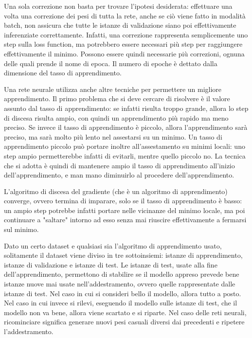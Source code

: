 Una sola correzione non basta per trovare l'ipotesi desiderata: effettuare una
volta una correzione dei pesi di tutta la rete, anche se ciò viene fatto in
modalità batch, non assicura che tutte le istanze di validazione siano poi
effettivamente inferenziate correttamente.
Infatti, una correzione rappresenta semplicemente uno step sulla loss function,
ma potrebbero essere necessari più step per raggiungere effettivamente
il minimo.
Possono essere quindi necessarie più correzioni, ognuna delle quali prende il
nome di epoca.
Il numero di epoche è dettato dalla dimensione del tasso di apprendimento.

Una rete neurale utilizza anche altre tecniche per permettere un migliore
apprendimento.
Il primo problema che si deve cercare di risolvere è il valore assunto dal tasso
di apprendimento: se infatti risulta troppo grande, allora lo step di discesa
risulta ampio, con quindi un apprendimento più rapido ma meno preciso.
Se invece il tasso di apprendimento è piccolo, allora l'apprendimento sarà
preciso, ma sarà molto più lento nel assestarsi su un minimo.
Un tasso di apprendimento piccolo può portare inoltre all'assestamento su minimi
locali: uno step ampio permetterebbe infatti di evitarli, mentre quello piccolo
no.
La tecnica che si adotta è quindi di mantenere ampio il tasso di apprendimento
all'inizio dell'apprendimento, e man mano diminuirlo al procedere
dell'apprendimento.

L'algoritmo di discesa del gradiente (che è un algoritmo di apprendimento)
converge, ovvero termina di imparare, solo se il tasso di apprendimento è basso:
un ampio step potrebbe infatti portare nelle vicinanze del minimo locale, ma poi
continuare a "saltare" intorno ad esso senza mai riuscire effettivamente a
fermarsi sul minimo.

Dato un certo dataset e qualsiasi sia l'algoritmo di apprendimento usato,
solitamente il dataset viene diviso in tre sottoinsiemi: istanze di
apprendimento, istanze di validazione e istanze di test.
Le istanze di test, usate alla fine dell'apprendimento, permettono di stabilire
se il modello appreso prevede bene istanze nuove mai usate nell'addestramento,
ovvero quelle rappresentate dalle istanze di test.
Nel caso in cui si consideri bello il modello, allora tutto a posto. Nel caso in
cui invece si rilevi, eseguendo il modello sulle istanze di test, che il modello
non va bene, allora viene scartato e si riparte.
Nel caso delle reti neurali, ricominciare significa generare nuovi pesi casuali
diversi dai precedenti e ripetere l'addestramento.



